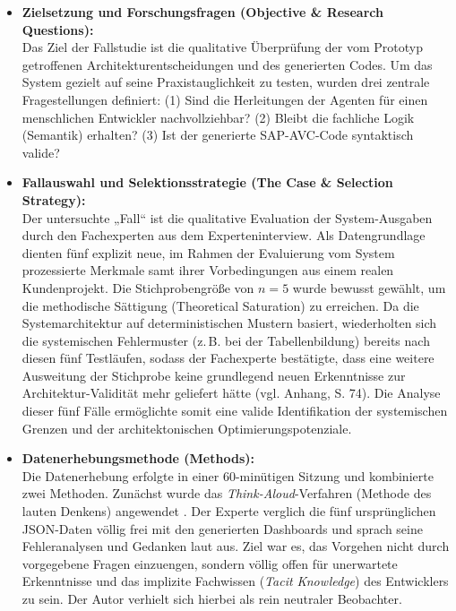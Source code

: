 \begin{itemize}
    \item \textbf{Zielsetzung und Forschungsfragen (Objective \& Research Questions):} \\
    Das Ziel der Fallstudie ist die qualitative Überprüfung der vom Prototyp getroffenen Architekturentscheidungen und des generierten Codes. Um das System gezielt auf seine Praxistauglichkeit zu testen, wurden drei zentrale Fragestellungen definiert: (1) Sind die Herleitungen der Agenten für einen menschlichen Entwickler nachvollziehbar? (2) Bleibt die fachliche Logik (Semantik) erhalten? (3) Ist der generierte SAP-\ac{AVC}-Code syntaktisch valide?

    \item \textbf{Fallauswahl und Selektionsstrategie (The Case \& Selection Strategy):} \\
    Der untersuchte „Fall“ ist die qualitative Evaluation der System-Ausgaben durch den Fachexperten aus dem Experteninterview. Als Datengrundlage dienten fünf explizit neue, im Rahmen der Evaluierung vom System prozessierte Merkmale samt ihrer Vorbedingungen aus einem realen Kundenprojekt. Die Stichprobengröße von $n=5$ wurde bewusst gewählt, um die methodische Sättigung (Theoretical Saturation) zu erreichen. Da die Systemarchitektur auf deterministischen Mustern basiert, wiederholten sich die systemischen Fehlermuster (z.\,B. bei der Tabellenbildung) bereits nach diesen fünf Testläufen, sodass der Fachexperte bestätigte, dass eine weitere Ausweitung der Stichprobe keine grundlegend neuen Erkenntnisse zur Architektur-Validität mehr geliefert hätte (vgl. Anhang, S. 74). Die Analyse dieser fünf Fälle ermöglichte somit eine valide Identifikation der systemischen Grenzen und der architektonischen Optimierungspotenziale.

    \item \textbf{Datenerhebungsmethode (Methods):} \\
    Die Datenerhebung erfolgte in einer 60-minütigen Sitzung und kombinierte zwei Methoden. Zunächst wurde das \textit{Think-Aloud}-Verfahren (Methode des lauten Denkens) angewendet \parencite{seamanQualitativeMethodsEmpirical1999}. Der Experte verglich die fünf ursprünglichen \ac{JSON}-Daten völlig frei mit den generierten Dashboards und sprach seine Fehleranalysen und Gedanken laut aus. Ziel war es, das Vorgehen nicht durch vorgegebene Fragen einzuengen, sondern völlig offen für unerwartete Erkenntnisse und das implizite Fachwissen (\textit{Tacit Knowledge}) des Entwicklers zu sein. Der Autor verhielt sich hierbei als rein neutraler Beobachter. 
    

\end{itemize}
